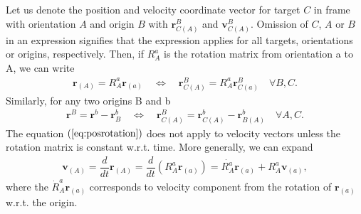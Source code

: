 \documentclass [12pt, a4paper] {article}
\newcommand{\vc}[1]
{
	\boldsymbol{#1}
}
\newcommand{\diff}[2]
{
	\dfrac{d #1}{d #2}
}
\begin{document}
Let us denote the position and velocity coordinate vector for target 
$C$ in frame with orientation $A$ and origin $B$ with $\vc r_{C(A)}^B$
and $\vc v_{C(A)}^B$. Omission of $C$, $A$ or $B$ in an expression 
signifies that the expression applies for all targets, orientations or 
origins, respectively. Then, if $R_A^a$ is the rotation matrix from
orientation a to A, we can write 
\begin {eqnarray}
    \label{eq:posrotation}
    \vc r_{(A)} = R_A^a\vc r_{(a)}
    \quad\Leftrightarrow\quad
    \vc r_{C(A)}^B = R_A^a\vc r_{C(a)}^B
    \quad 
    \forall B, C.
\end {eqnarray}
Similarly, for any two origins B and b 
\begin {eqnarray}
    \vc r^B = \vc r^b - \vc r^b_B 
    \quad\Leftrightarrow\quad
    \vc r_{C(A)}^B = \vc r_{C(A)}^b - \vc r_{B(A)}^b 
    \quad 
    \forall A, C.
\end {eqnarray}
The equation $(\ref{eq:posrotation})$ does not apply to velocity vectors
unless the rotation matrix is constant w.r.t. time. More generally, we can 
expand  
\begin {eqnarray}
    \vc v_{(A)}
    =
    \diff{}{t}\vc r_{(A)}
    = 
    \diff{}{t}\left(
        R_A^a\vc r_{(a)}
    \right)
    =
    \dot{R_A^a}\vc r_{(a)}
    +
    R_A^a
    \vc v_{(a)},
\end {eqnarray}
where the $\dot R_A^a\vc r_{(a)}$ corresponds to velocity component from 
the rotation of $\vc r_{(a)}$ w.r.t. the origin.
\end{document}
